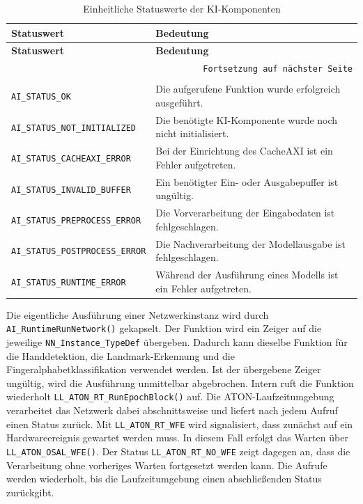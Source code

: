 \begin{longtable}{|p{}|p{}|}
    \hline
    \textbf{Statuswert} & \textbf{Bedeutung} \\
    \hline
    \endfirsthead
    \hline
    \textbf{Statuswert} & \textbf{Bedeutung} \\
    \hline
    \endhead
    \hline
    \multicolumn{2}{r}{\texttt{Fortsetzung auf nächster Seite}} \\
    \endfoot
    \caption{Einheitliche Statuswerte der KI-Komponenten}
    \label{tab:ki-statuswerte} \\
    \endlastfoot
    \texttt{AI\_STATUS\_OK}                & Die aufgerufene Funktion wurde erfolgreich ausgeführt. \\
    \hline
    \texttt{AI\_STATUS\_NOT\_INITIALIZED}  & Die benötigte KI-Komponente wurde noch nicht initialisiert. \\
    \hline
    \texttt{AI\_STATUS\_CACHEAXI\_ERROR}   & Bei der Einrichtung des CacheAXI ist ein Fehler aufgetreten. \\
    \hline
    \texttt{AI\_STATUS\_INVALID\_BUFFER}   & Ein benötigter Ein- oder Ausgabepuffer ist ungültig. \\
    \hline
    \texttt{AI\_STATUS\_PREPROCESS\_ERROR} & Die Vorverarbeitung der Eingabedaten ist fehlgeschlagen. \\
    \hline
    \texttt{AI\_STATUS\_POSTPROCESS\_ERROR}& Die Nachverarbeitung der Modellausgabe ist fehlgeschlagen. \\
    \hline
    \texttt{AI\_STATUS\_RUNTIME\_ERROR}    & Während der Ausführung eines Modells ist ein Fehler aufgetreten. \\
    \hline
\end{longtable}

Die eigentliche Ausführung einer Netzwerkinstanz wird durch \texttt{AI\_RuntimeRunNetwork()} gekapselt. Der Funktion wird ein Zeiger auf die jeweilige \texttt{NN\_Instance\_TypeDef} übergeben. Dadurch kann dieselbe Funktion für die Handdetektion, die Landmark-Erkennung und die Fingeralphabetklassifikation verwendet werden. Ist der übergebene Zeiger ungültig, wird die Ausführung unmittelbar abgebrochen. Intern ruft die Funktion wiederholt \texttt{LL\_ATON\_RT\_RunEpoch\allowbreak Block()} auf. Die ATON-Laufzeitumgebung verarbeitet das Netzwerk dabei abschnittsweise und liefert nach jedem Aufruf einen Status zurück. Mit \texttt{LL\_ATON\_RT\_WFE} wird signalisiert, dass zunächst auf ein Hardwareereignis gewartet werden muss. In diesem Fall erfolgt das Warten über \texttt{LL\_ATON\_OSAL\_WFE()}. Der Status \texttt{LL\_ATON\_RT\_NO\_WFE} zeigt dagegen an, dass die Verarbeitung ohne vorheriges Warten fortgesetzt werden kann. Die Aufrufe werden wiederholt, bis die Laufzeitumgebung einen abschließenden Status zurückgibt.

